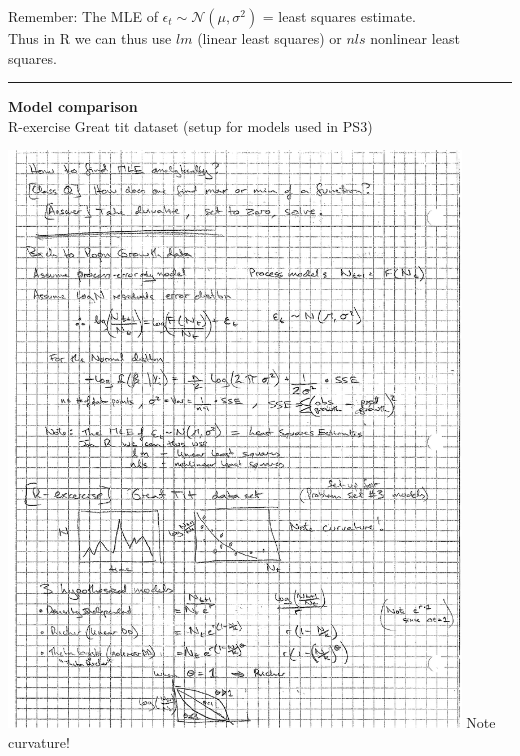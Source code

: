 \documentclass{article}
\newcommand{\note}[1]{\colorbox{gray!30}{#1}}
\newcommand{\ind}{\-\hspace{1cm}}
\begin{document}
Remember: The MLE of $\epsilon_t \sim \mathcal{N}(\mu,\sigma^2)$ = least squares estimate.\\
\ind  Thus in R we can thus use $lm$ (linear least squares) or $nls$ nonlinear least squares.\\

\rule[0.5ex]{\linewidth}{1pt}
\pagebreak

\textbf{Model comparison}\\
\note{R-exercise} Great tit dataset (setup for models used in PS3)
\begin{center}
	\includegraphics[width=12cm]{figs/image7.pdf} Note curvature!
\end{center}
\end{document}
